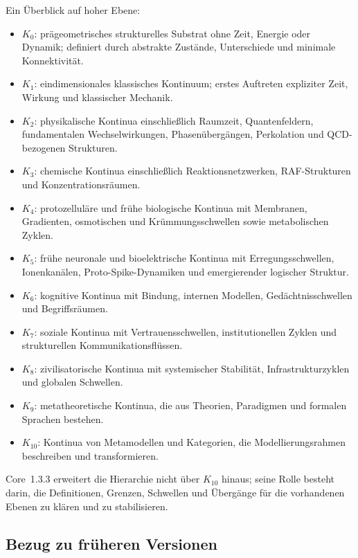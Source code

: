 Ein Überblick auf hoher Ebene:

\begin{itemize}
    \item \(K_0\): prägeometrisches strukturelles Substrat ohne Zeit, Energie oder Dynamik; definiert durch abstrakte Zustände, Unterschiede und minimale Konnektivität.
    \item \(K_1\): eindimensionales klassisches Kontinuum; erstes Auftreten expliziter Zeit, Wirkung und klassischer Mechanik.
    \item \(K_2\): physikalische Kontinua einschließlich Raumzeit, Quantenfeldern, fundamentalen Wechselwirkungen, Phasenübergängen, Perkolation und QCD-bezogenen Strukturen.
    \item \(K_3\): chemische Kontinua einschließlich Reaktionsnetzwerken, RAF-Strukturen und Konzentrationsräumen.
    \item \(K_4\): protozelluläre und frühe biologische Kontinua mit Membranen, Gradienten, osmotischen und Krümmungsschwellen sowie metabolischen Zyklen.
    \item \(K_5\): frühe neuronale und bioelektrische Kontinua mit Erregungsschwellen, Ionenkanälen, Proto-Spike-Dynamiken und emergierender logischer Struktur.
    \item \(K_6\): kognitive Kontinua mit Bindung, internen Modellen, Gedächtnisschwellen und Begriffsräumen.
    \item \(K_7\): soziale Kontinua mit Vertrauensschwellen, institutionellen Zyklen und strukturellen Kommunikationsflüssen.
    \item \(K_8\): zivilisatorische Kontinua mit systemischer Stabilität, Infrastrukturzyklen und globalen Schwellen.
    \item \(K_9\): metatheoretische Kontinua, die aus Theorien, Paradigmen und formalen Sprachen bestehen.
    \item \(K_{10}\): Kontinua von Metamodellen und Kategorien, die Modellierungsrahmen beschreiben und transformieren.
\end{itemize}

Core~1.3.3 erweitert die Hierarchie nicht über \(K_{10}\) hinaus; seine Rolle besteht darin, die Definitionen, Grenzen, Schwellen und Übergänge für die vorhandenen Ebenen zu klären und zu stabilisieren.

\subsection{Bezug zu früheren Versionen}

